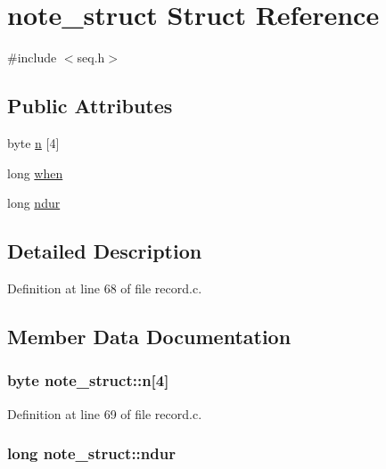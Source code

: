 \hypertarget{unionnote__struct}{}\section{note\+\_\+struct Struct Reference}
\label{unionnote__struct}


{\ttfamily \#include $<$seq.\+h$>$}

\subsection*{Public Attributes}
\begin{DoxyCompactItemize}
\item 
byte \hyperlink{unionnote__struct_af6bbffb80c1b46c3ae5c88f3cf0027e1}{n} \mbox{[}4\mbox{]}
\item 
long \hyperlink{unionnote__struct_a5e75e5fdc5643f7d59087dbab93cf0b8}{when}
\item 
long \hyperlink{unionnote__struct_a28cbc03abb6e0d8b7607ca891e9061e9}{ndur}
\end{DoxyCompactItemize}


\subsection{Detailed Description}


Definition at line 68 of file record.\+c.



\subsection{Member Data Documentation}
\subsubsection[{\texorpdfstring{n}{n}}]{\setlength{\rightskip}{0pt plus 5cm}byte note\+\_\+struct\+::n\mbox{[}4\mbox{]}}\hypertarget{unionnote__struct_af6bbffb80c1b46c3ae5c88f3cf0027e1}{}\label{unionnote__struct_af6bbffb80c1b46c3ae5c88f3cf0027e1}


Definition at line 69 of file record.\+c.

\subsubsection[{\texorpdfstring{ndur}{ndur}}]{\setlength{\rightskip}{0pt plus 5cm}long note\+\_\+struct\+::ndur}\hypertarget{unionnote__struct_a28cbc03abb6e0d8b7607ca891e9061e9}{}\label{unionnote__struct_a28cbc03abb6e0d8b7607ca891e9061e9}


